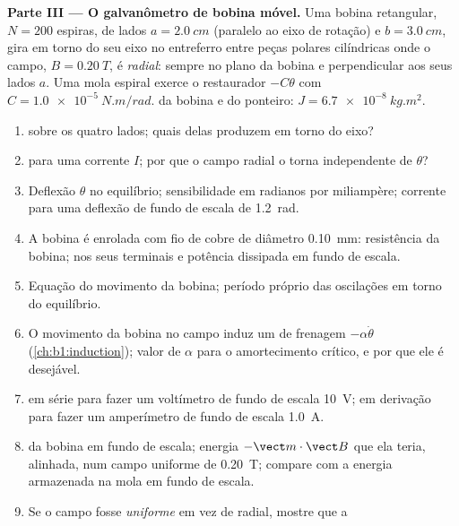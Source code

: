 \begin{problem}
\medskip
\noindent\textbf{Parte III --- O galvanômetro de bobina móvel.}
Uma bobina retangular, $N = 200$ espiras, de lados $a = \qty{2.0}{cm}$ (paralelo ao
eixo de rotação) e $b = \qty{3.0}{cm}$, gira em torno do seu eixo no
entreferro entre peças polares cilíndricas onde o campo, $B = \qty{0.20}{T}$,
é \emph{radial}: sempre no plano da bobina e perpendicular aos seus
lados $a$. Uma mola espiral exerce o  restaurador $-C\theta$ com
$C = \qty{1.0e-5}{N.m/rad}$.  da bobina e do ponteiro:
$J = \qty{6.7e-8}{kg.m^2}$.
\begin{enumerate}[resume]
  \item {} sobre os quatro lados; quais delas produzem 
        em torno do eixo?
  \item {} para uma corrente $I$; por que o campo radial o torna
        independente de $\theta$?
  \item Deflexão $\theta$ no equilíbrio; sensibilidade em radianos por
        miliampère; corrente para uma deflexão de fundo de escala de \qty{1.2}{rad}.
  \item A bobina é enrolada com fio de cobre de diâmetro \qty{0.10}{mm}:
        resistência da bobina;  nos seus terminais e potência dissipada em
        fundo de escala.
  \item Equação do movimento da bobina; período próprio das
        oscilações em torno do equilíbrio.
  \item O movimento da bobina no campo induz um  de frenagem
        $-\alpha\dot\theta$ (\cref{ch:b1:induction}); valor de $\alpha$ para
        o amortecimento crítico, e por que ele é desejável.
  \item {} em série para fazer um voltímetro de fundo de escala \qty{10}{V}; 
        em derivação para fazer um amperímetro de fundo de escala \qty{1.0}{A}.
  \item {} da bobina em fundo de escala; energia $-\vect m\cdot
        \vect B$ que ela teria, alinhada, num campo uniforme de \qty{0.20}{T};
        compare com a energia armazenada na mola em fundo de escala.
  \item Se o campo fosse \emph{uniforme} em vez de radial, mostre que a

\end{enumerate}
\end{problem}
